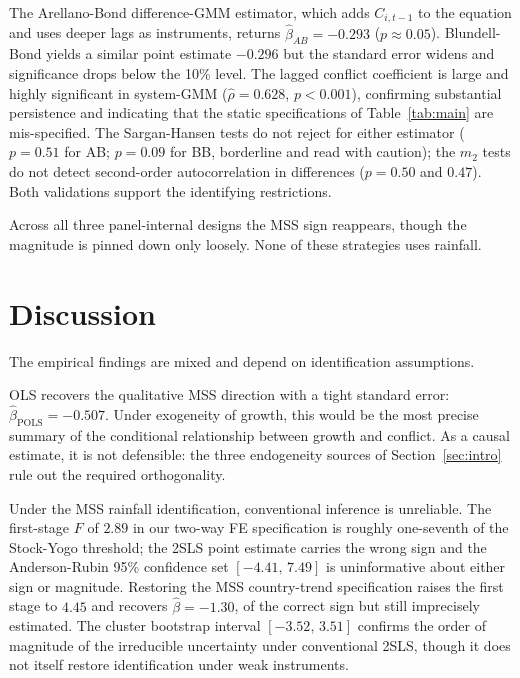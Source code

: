 \documentclass[11pt,a4paper]{article}
\begin{document}
The Arellano-Bond difference-GMM estimator, which adds $C_{i,t-1}$ to
the equation and uses deeper lags as instruments, returns
$\hat\beta_{AB} = -0.293$ ($p \approx 0.05$). Blundell-Bond yields a
similar point estimate $-0.296$ but the standard error widens and
significance drops below the 10\% level. The lagged conflict
coefficient is large and highly significant in system-GMM
($\hat\rho = 0.628$, $p < 0.001$), confirming substantial persistence
and indicating that the static specifications of
Table~\ref{tab:main} are mis-specified. The Sargan-Hansen tests do
not reject for either estimator ($p = 0.51$ for AB; $p = 0.09$ for BB,
borderline and read with caution); the $m_2$ tests do not detect
second-order autocorrelation in differences ($p = 0.50$ and $0.47$).
Both validations support the identifying restrictions.

Across all three panel-internal designs the MSS sign reappears,
though the magnitude is pinned down only loosely. None of these
strategies uses rainfall.

\newpage

\section{Discussion}\label{sec:discussion}
The empirical findings are mixed and depend on identification assumptions.

OLS recovers the qualitative MSS direction with a tight standard
error: $\hat\beta_{\text{POLS}} = -0.507$. Under exogeneity of growth,
this would be the most precise summary of the conditional relationship
between growth and conflict. As a causal estimate, it is not
defensible: the three endogeneity sources of Section~\ref{sec:intro}
rule out the required orthogonality.

Under the MSS rainfall identification, conventional inference is
unreliable. The first-stage $F$ of $2.89$ in our two-way FE
specification is roughly one-seventh of the Stock-Yogo threshold; the
2SLS point estimate carries the wrong sign and the Anderson-Rubin
95\% confidence set $[-4.41,\,7.49]$ is uninformative about either
sign or magnitude. Restoring the MSS country-trend specification
raises the first stage to $4.45$ and recovers $\hat\beta = -1.30$, of
the correct sign but still imprecisely estimated. The cluster
bootstrap interval $[-3.52,\,3.51]$ confirms the order of magnitude of
the irreducible uncertainty under conventional 2SLS, though it does
not itself restore identification under weak instruments.
\end{document}

